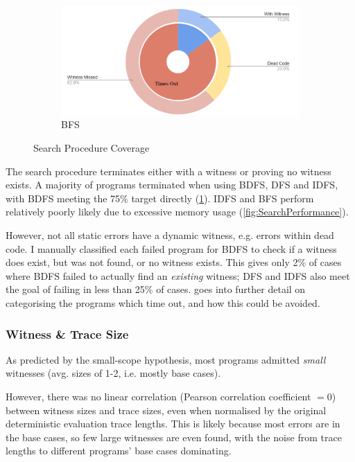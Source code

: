 \begin{figure}[h]
\begin{subfigure}{0.45\textwidth}
\includegraphics[width=\textwidth]{Media/Figures/BFS_coverage}
\caption{BFS}
\end{subfigure}

\caption{Search Procedure Coverage}
\label{fig:PieChart}
\end{figure}

The search procedure terminates either with a witness or proving no witness exists. A majority of programs terminated when using BDFS, DFS and IDFS, with BDFS meeting the 75\% target directly (\cref{fig:PieChart}). IDFS and BFS perform relatively poorly likely due to excessive memory usage (\cref{fig:SearchPerformance}). 

However, not all static errors have a dynamic witness, e.g. errors within dead code. I manually classified each failed program for BDFS to check if a witness does exist, but was not found, or no witness exists. This gives only 2\% of cases where BDFS failed to actually find an \textit{existing} witness; DFS and IDFS also meet the goal of failing in less than 25\% of cases.  goes into further detail on categorising the programs which time out, and how this could be avoided.

\subsubsection{Witness \& Trace Size}
As predicted by the small-scope hypothesis, most programs admitted \textit{small} witnesses (avg. sizes of 1-2, i.e. mostly base cases). 

However, there was no linear correlation (Pearson correlation coefficient $= 0$) between witness sizes and trace sizes, even when normalised by the original deterministic evaluation trace lengths. This is likely because most errors are in the base cases, so few large witnesses are even found, with the noise from trace lengths to different programs' base cases dominating. 



